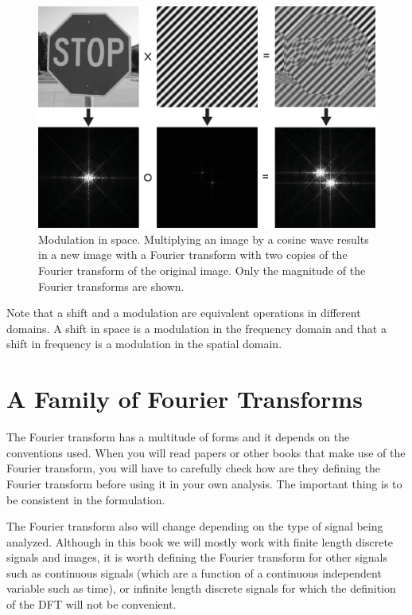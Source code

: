 \begin{figure}[t]
	\centerline{
		\includegraphics[width=1\linewidth]{figures/Image_processing_fourier/modulation.eps}}
	\caption{Modulation in space. Multiplying an image by a cosine wave results in a new image with a Fourier transform with two copies of the Fourier transform of the original image. Only the magnitude of the Fourier transforms are shown.}
	\label{fig:modulation}
\end{figure}

Note that a shift and a modulation are equivalent operations in different domains. A shift in space is a modulation in the frequency domain and that a shift in frequency is a modulation in the spatial domain.


\section{A Family of Fourier Transforms}

The Fourier transform has a multitude of forms and it depends on the conventions used. When you will read papers or other books that make use of the Fourier transform, you will have to carefully check how are they defining the Fourier transform before using it in your own analysis. The important thing is to be consistent in the formulation.

The Fourier transform also will change depending on the type of signal being analyzed. Although in this book we will mostly work with finite length discrete signals and images, it is worth defining the Fourier transform for other signals such as continuous signals (which are a function of a continuous independent variable such as time), or infinite length discrete signals for which the definition of the DFT will not be convenient.


